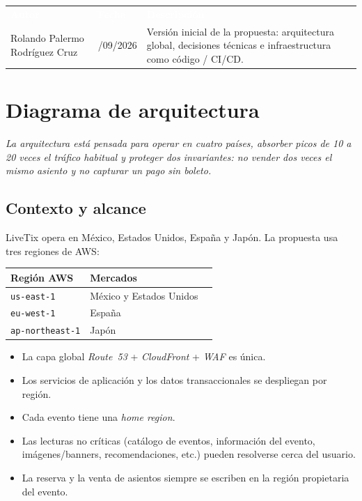 \documentclass[11pt,a4paper]{article}
\newcommand{\sectionintro}[1]{\vspace{-0.15em}\textit{\textcolor{livetixgray}{#1}}\par\vspace{0.45em}}
\begin{document}
\renewcommand{\arraystretch}{1.4}
\begin{tabularx}{\textwidth}{>{\raggedright\arraybackslash}p{4.4cm}
                             >{\centering\arraybackslash}p{2.6cm}
                             >{\raggedright\arraybackslash}X}
\rowcolor{livetixblue}
\textcolor{white}{\textbf{Autor}} &
\textcolor{white}{\textbf{Fecha}} &
\textcolor{white}{\textbf{Descripción}} \\
Rolando Palermo Rodríguez Cruz & 06/09/2026 &
Versión inicial de la propuesta: arquitectura global, decisiones técnicas e infraestructura como código / CI/CD. \\
\end{tabularx}
\renewcommand{\arraystretch}{1.0}

\vspace{1.1cm}
\tableofcontents
\clearpage

\section{Diagrama de arquitectura}

\sectionintro{La arquitectura está pensada para operar en cuatro países, absorber picos de 10 a 20 veces el tráfico habitual y proteger dos invariantes: no vender dos veces el mismo asiento y no capturar un pago sin boleto.}

\subsection{Contexto y alcance}

LiveTix opera en México, Estados Unidos, España y Japón. La propuesta usa tres regiones de AWS:

\begin{center}
\renewcommand{\arraystretch}{1.25}
\begin{tabular}{lll}
\toprule
\textbf{Región AWS} & \textbf{Mercados} \\
\midrule
\texttt{us-east-1} & México y Estados Unidos \\
\texttt{eu-west-1} & España \\
\texttt{ap-northeast-1} & Japón \\
\bottomrule
\end{tabular}
\end{center}

\begin{itemize}
    \item La capa global \textit{Route~53} +  \textit{CloudFront} +  \textit{WAF} es única.
    \item Los servicios de aplicación y los datos transaccionales se despliegan por región.
    \item Cada evento tiene una \textit{home region}.
    \item Las lecturas no críticas (catálogo de eventos, información del evento, imágenes/banners, recomendaciones, etc.) pueden resolverse cerca del usuario.
    \item La reserva y la venta de asientos siempre se escriben en la región propietaria del evento.
\end{itemize}
\end{document}
